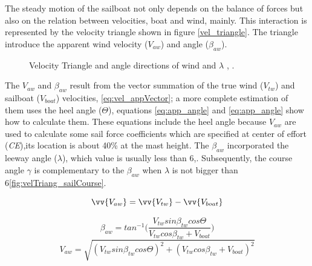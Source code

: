 The steady motion of the sailboat not only depends on the balance of forces but also on the relation between velocities, boat and wind, mainly. This interaction is represented by the velocity triangle shown in figure \ref{vel_triangle}. The triangle introduce the apparent wind velocity ($V_{aw}$) and angle ($\beta_{aw}$).\par 

\begin{figure} %
  \centering
  \hfill
  \caption{Velocity Triangle and angle directions of wind and $\lambda$  \cite{marchajaereo1979}, \cite{larsonprinciples}.}
\label{fig:Vel_Trian_Ang} 
\end{figure}

The $V_{aw}$ and $\beta_{aw}$ result from the vector summation of the true wind ($V_{tw}$) and sailboat ($V_{boat}$) velocities, \ref{eq:vel_appVector}; a more complete estimation of them uses the heel angle ($\Theta$), equations \ref{eq:app_angle} and \ref{eq:app_angle} show how to calculate them. These equations include the heel angle because $V_{aw}$ are used to calculate some sail force coefficients which are specified at center of effort (\textit{CE}),its location is about 40\% at the mast height. The $\beta_{aw}$ incorporated the leeway angle ($\lambda$), which value is usually less than 6\degree \cite{philpott1993yacht},\cite{claughton1998sailing}. Subsequently, the course angle $\gamma$ is complementary to the $\beta_{aw}$ when $\lambda$ is not bigger than 6\degree \ref{fig:velTriang_sailCourse}. \par
\begin{equation}\label{eq:vel_appVector}
    \vv{V_{aw}}=\vv{V_{tw}}-\vv{V_{boat}}
\end{equation}

\begin{equation} \label{eq:app_angle}
    \beta_{aw}=tan^{-1} \bigg( \frac{ V_{tw} sin \beta_{tw} cos \Theta }{ V_{tw} cos \beta_{tw} + V_{boat}} \bigg)
\end{equation}
\newline
\begin{equation} \label{eq:ap_vel}
    V_{aw}=  \sqrt{ (V_{tw} sin \beta_{tw} cos \Theta)^2 + (V_{tw} cos \beta_{tw} + V_{boat})^2}
\end{equation}
